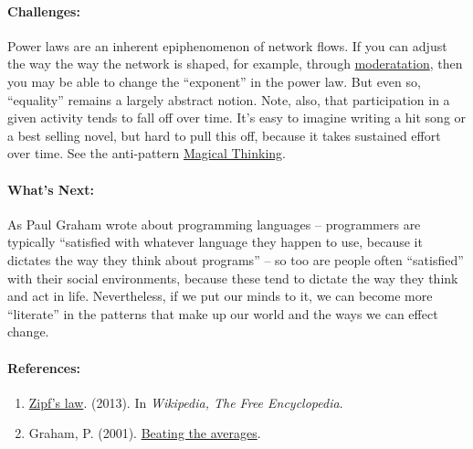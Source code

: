 \paragraph{Challenges:} Power laws are an inherent epiphenomenon of network
flows. If you can adjust the way the way the network is shaped, for
example, through
\href{http://peeragogy.org/practice/moderation/}{moderatation}, then you
may be able to change the ``exponent'' in the power law. But even so,
``equality'' remains a largely abstract notion. Note, also, that
participation in a given activity tends to fall off over time. It's easy
to imagine writing a hit song or a best selling novel, but hard to pull
this off, because it takes sustained effort over time. See the
anti-pattern
\href{http://peeragogy.org/antipatterns/magical-thinking/}{Magical
Thinking}.

\paragraph{What's Next:} As Paul Graham wrote about programming languages
-- programmers are typically ``satisfied with whatever language they
happen to use, because it dictates the way they think about programs''
-- so too are people often ``satisfied'' with their social environments,
because these tend to dictate the way they think and act in life.
Nevertheless, if we put our minds to it, we can become more ``literate''
in the patterns that make up our world and the ways we can effect
change.

\paragraph{References:}

\begin{enumerate}
\item
  \href{http://en.wikipedia.org/w/index.php?title=Zipf\%27s_law\&oldid=575709945}{Zipf's
  law}. (2013). In \emph{Wikipedia, The Free Encyclopedia}.
\item
  Graham, P. (2001). \href{http://www.paulgraham.com/avg.html}{Beating
  the averages}.
\end{enumerate}
